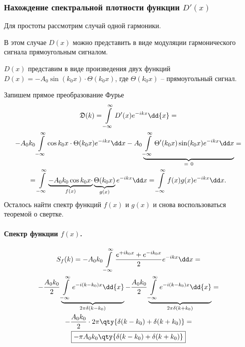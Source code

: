 \documentclass[a4paper,14pt]{extarticle}
\begin{document}
\subsubsection{Нахождение спектральной плотности функции $D'(x)$}%
Для простоты рассмотрим случай одной гармоники. 

В этом случае $D(x)$ можно представить в виде модуляции гармонического сигнала
прямоугольным сигналом.


$D(x)$ представим в виде произведения двух функций 
$D(x) = -A_{0}\sin(k_{0}x) \cdot  \Theta(k_{0} x)$,
где $\Theta(k_{0}x)$ -- прямоугольный сигнал.

Запишем прямое преобразование Фурье 
\begin{gather}
    \label{eq:D}
    \D(k) = \int\limits_{-\infty}^{\infty} D'(x) e^{-ikx} \dd{x} = \\
    - A_0 k_0\int\limits_{-\infty}^{\infty} 
     \cos k_{0}x\cdot \Theta (k_{0} x) e^{-ikx}\dd x
     - A_{0}
     \underbrace{
     \int\limits_{-\infty}^{\infty} 
    \Theta'(k_{0} x) \sin(k_{0} x) e^{-ikx}\dd x
}_{=~0} = \\
    = \int\limits_{-\infty}^{\infty} 
    \underbrace{- A_{0} k_{0} \cos k_{0}x\cdot}_{f(x)}
    \underbrace{\Theta (k_{0} x) }_{g(x)}e^{-ikx}
    \dd x = \int\limits_{-\infty}^{\infty} f(x) g(x) e^{-ikx} \dd x. 
\end{gather}
Осталось найти спектр функций $f(x)$ и  $g(x)$ и снова воспользоваться теоремой о свертке.

\paragraph{Спектр функции $f(x)$.}%
\begin{gather}
    S_f(k) = - A_{0} k_{0}\int\limits_{-\infty}^{\infty} \frac{e^{+ik_{0}x} + e^{-ik_{0}x}}{2} e^{-ikx} \dd x = \\ 
    - \frac{A_{0} k_{0}}{2}
    \underbrace{ 
         \int\limits_{-\infty}^{\infty} e^{-i(k-k_{0})x}\dd{x}  
    }_{2 \pi \delta(k-k_{0})}
    - \frac{A_{0} k_{0}}{2} 
    \underbrace{
    \int\limits_{-\infty}^{\infty} e^{-i(k-k_{0})x}\dd{x} 
    }_{2 \pi \delta(k+k_{0})} = \\
    -\frac{A_{0} k_{0}}{2} \cdot 2 \pi \qty{ \delta(k-k_{0}) + \delta(k+k_{0}) } = \\
    \boxed{
    - \pi A_{0} k_{0} \qty{ \delta(k-k_{0}) + \delta(k+k_{0})}
    }
\end{gather}
\end{document}
